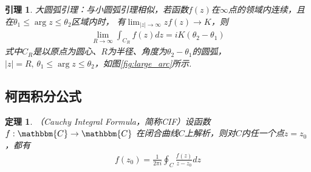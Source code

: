 \documentclass[12pt, a4paper]{ctexbook}
\newtheorem{theorem}{定理}[chapter] %
\newtheorem{lemma}{引理}[chapter] %
\begin{document}
                \begin{lemma}
                    \label{lem:large_arc_lemma}
                    大圆弧引理：与小圆弧引理相似，若函数$f(z)$在$\infty$点的领域内连续，且在$\theta_1 \leq \arg{z} \leq \theta_2$区域内时，
                    有$\lim_{|z| \to \infty}zf(z) \to K$，则
                    \begin{align*}
                        \lim_{R \to \infty}\int_{C_R}f(z)dz = iK(\theta_2 - \theta_1)
                    \end{align*}
                    式中$C_R$是以原点为圆心、$R$为半径、角度为$\theta_2 - \theta_1$的圆弧，
                    $|z| = R,\,\theta_1 \leq \arg{z} \leq \theta_2$，如图\ref{fig:large_arc}所示.
                \end{lemma}

            \subsection{柯西积分公式}
                \begin{theorem}
                    \label{the:cauchy_integral_formula}
                    （Cauchy Integral Formula，简称CIF）设函数$f:\mathbbm{C} \to \mathbbm{C}$
                    在闭合曲线$C$上解析，则对$C$内任一个点$z = z_0$，都有
                    \begin{align*}
                        \label{eq:cauchy_integral_formula}
                        f(z_0) = \frac{1}{2 \pi i}\oint_{C}\frac{f(z)}{z - z_0}dz
                    \end{align*}
                \end{theorem}
\end{document}
